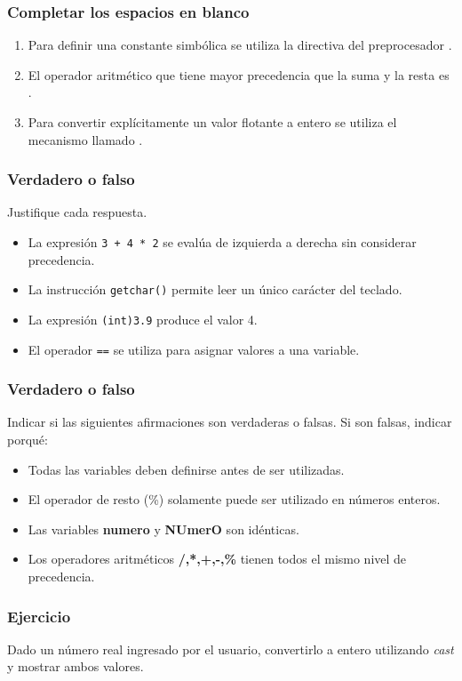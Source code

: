 \subsubsection{Completar los espacios en blanco}
\begin{enumerate}
  \item Para definir una constante simbólica se utiliza la directiva del preprocesador \underspace.
  \item El operador aritmético que tiene mayor precedencia que la suma y la resta es \underspace.
  \item Para convertir explícitamente un valor flotante a entero se utiliza el mecanismo llamado \underspace.
\end{enumerate}
    
\subsubsection{Verdadero o falso}
Justifique cada respuesta.
\begin{itemize}
  \item La expresión \texttt{3 + 4 * 2} se evalúa de izquierda a derecha sin considerar precedencia.
  \item La instrucción \texttt{getchar()} permite leer un único carácter del teclado.
  \item La expresión \texttt{(int)3.9} produce el valor 4.
  \item El operador \texttt{==} se utiliza para asignar valores a una variable.
\end{itemize}


\subsubsection{Verdadero o falso}
Indicar si las siguientes afirmaciones son verdaderas o falsas. Si son falsas, indicar porqué:
\begin{itemize}
  \item Todas las variables deben definirse antes de ser utilizadas.
  \item El operador de resto (\%) solamente puede ser utilizado en números enteros.
  \item Las variables \textbf{numero} y \textbf{NUmerO} son idénticas.
  \item Los operadores aritméticos \textbf{/,*,+,-,\%} tienen todos el mismo nivel de precedencia.
\end{itemize}

\subsubsection{Ejercicio}
Dado un número real ingresado por el usuario, convertirlo a entero utilizando \textit{cast} y mostrar ambos valores.

